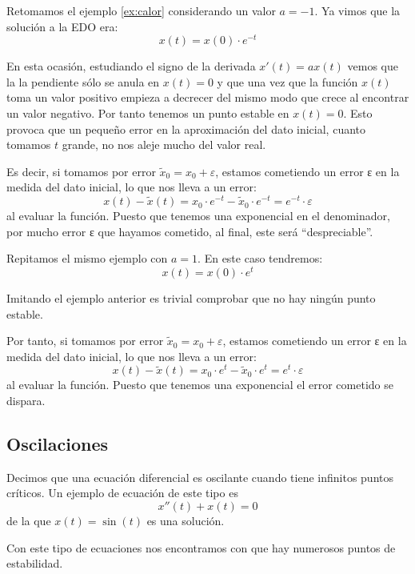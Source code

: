\begin{example}
Retomamos el ejemplo \ref{ex:calor} considerando un valor $a=-1$. Ya vimos que la solución a la EDO era:
\[x(t) = x(0)\cdot e^{-t}\]

En esta ocasión, estudiando el signo de la derivada $x'(t)=ax(t)$ vemos que la la pendiente sólo se anula en $x(t)=0$ y que una vez que la función $x(t)$ toma un valor positivo empieza a decrecer del mismo modo que crece al encontrar un valor negativo. Por tanto tenemos un punto estable en $x(t)=0$. Esto provoca que un pequeño error en la aproximación del dato inicial, cuanto tomamos $t$ grande, no nos aleje mucho del valor real.

Es decir, si tomamos por error $\tilde{x}_0 = x_0 + ε$, estamos cometiendo un error ε en la medida del dato inicial, lo que nos lleva a un error:
\[x(t)-\tilde{x}(t) = x_0\cdot e^{-t} - \tilde{x}_0\cdot e^{-t} = e^{-t}\cdot ε\]
al evaluar la función. Puesto que tenemos una exponencial en el denominador, por mucho error ε que hayamos cometido, al final, este será ``despreciable''.
\end{example}

\begin{example}
Repitamos el mismo ejemplo con $a=1$. En este caso tendremos:
\[x(t) = x(0)\cdot e^{t}\]

Imitando el ejemplo anterior es trivial comprobar que no hay ningún punto estable.

Por tanto, si tomamos por error $\tilde{x}_0 = x_0 + ε$, estamos cometiendo un error ε en la medida del dato inicial, lo que nos lleva a un error:
\[x(t)-\tilde{x}(t) = x_0\cdot e^{t} - \tilde{x}_0\cdot e^{t} = e^{t}\cdot ε\]
al evaluar la función. Puesto que tenemos una exponencial el error cometido se dispara.
\end{example}

\subsection{Oscilaciones}

\begin{definition}
Decimos que una ecuación diferencial es oscilante cuando tiene infinitos puntos críticos. Un ejemplo de ecuación de este tipo es
\[x''(t)+x(t)=0\]
de la que $x(t)=\sin(t)$ es una solución.
\end{definition}

Con este tipo de ecuaciones nos encontramos con que hay numerosos puntos de estabilidad.

